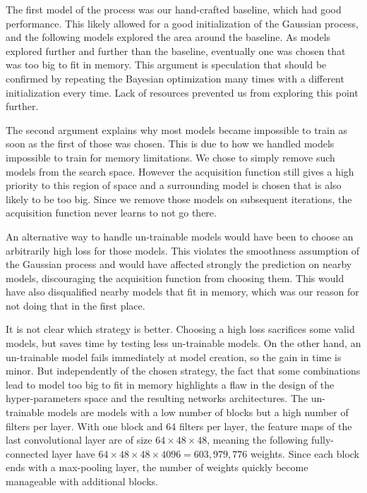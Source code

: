 The first model of the process was our hand-crafted baseline, which had good performance. This likely allowed for a good initialization of the Gaussian process, and the following models explored the area around the baseline. As models explored further and further than the baseline, eventually one was chosen that was too big to fit in memory. This argument is speculation that should be confirmed by repeating the Bayesian optimization many times with a different initialization every time. Lack of resources prevented us from exploring this point further.

The second argument explains why most models became impossible to train as soon as the first of those was chosen. This is due to how we handled models impossible to train for memory limitations. We chose to simply remove such models from the search space. However the acquisition function still gives a high priority to this region of space and a surrounding model is chosen that is also likely to be too big. Since we remove those models on subsequent iterations, the acquisition function never learns to not go there.

An alternative way to handle un-trainable models would have been to choose an arbitrarily high loss for those models. This violates the smoothness assumption of the Gaussian process and would have affected strongly the prediction on nearby models, discouraging the acquisition function from choosing them. This would have also disqualified nearby models that fit in memory, which was our reason for not doing that in the first place. 

It is not clear which strategy is better. Choosing a high loss sacrifices some valid models, but saves time by testing less un-trainable models. On the other hand, an un-trainable model fails immediately at model creation, so the gain in time is minor. 
But independently of the chosen strategy, the fact that some combinations lead to model too big to fit in memory highlights a flaw in the design of the hyper-parameters space and the resulting networks architectures. The un-trainable models are models with a low number of blocks but a high number of filters per layer. With one block and 64 filters per layer, the feature maps of the last convolutional layer are of size $64 \times 48 \times 48$, meaning the following fully-connected layer have $64 \times 48 \times 48 \times 4096 = 603,979,776$ weights. Since each block ends with a max-pooling layer, the number of weights quickly become manageable with additional blocks. 

